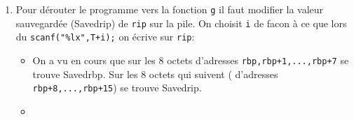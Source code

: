 \documentclass[a4paper,9pt]{article}
\newenvironment{terminal}{\color{black}\begin{snugshade*}}
{\end{snugshade*}\color{black}}
\theoremstyle{plain}
\theoremstyle{definition}
\begin{document}
\begin{correction}
\begin{enumerate}
\begin{itemize}
\item Les instructions 

\begin{terminal}\small
\begin{verbatim}
   0x0000000000401199 <+12>:	mov    QWORD PTR [rbp-0x20],0x0
   0x00000000004011a1 <+20>:	mov    QWORD PTR [rbp-0x18],0x1
   0x00000000004011a9 <+28>:	mov    QWORD PTR [rbp-0x10],0x2
   0x00000000004011b1 <+36>:	mov    QWORD PTR [rbp-0x8],0x3
\end{verbatim}
\end{terminal}
correspondent aux affectation \verb|T[0]=0,...,T[3]=3| du code C. Les instructions pour l'appel \verb|printf("i=")| sont situés juste-après:

\begin{terminal}\small
\begin{verbatim}
   0x00000000004011b9 <+44>:	lea    rdi,[rip+0xe68]        # 0x402028
   0x00000000004011c0 <+51>:	mov    eax,0x0
   0x00000000004011c5 <+56>:	call   0x401070 <printf@plt>
\end{verbatim}
\end{terminal}

  \end{itemize}
\item Pour dérouter le programme vers la fonction \verb|g| il faut modifier la valeur sauvegardée (Savedrip) de \verb|rip| sur la pile. On choisit \verb|i| de facon à ce que lors du \verb|scanf("%lx",T+i);| on écrive sur \verb|rip|:
  \begin{itemize}
    \item On a vu en cours que sur les 8 octets  d'adresses  \verb|rbp,rbp+1,...,rbp+7| se trouve Savedrbp. Sur les 8 octets qui suivent ( d'adresses  \verb|rbp+8,...,rbp+15|)  se trouve Savedrip.
  \item


\end{itemize}
\end{enumerate}
\end{correction}
\end{document}
